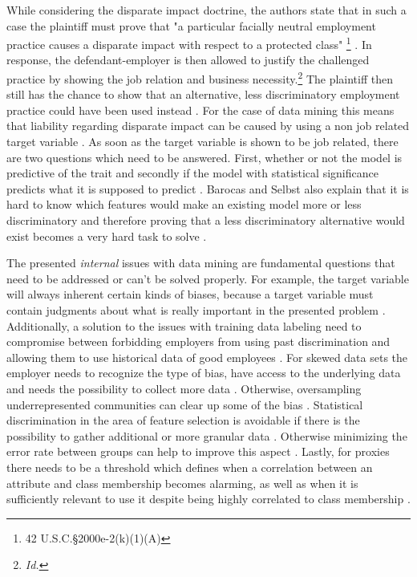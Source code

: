 While considering the disparate impact doctrine, the authors state that in such a case 
the plaintiff must prove that "a particular facially neutral employment practice causes 
a disparate impact with respect to a protected class" \footnote{ 42 U.S.C.§2000e-2(k)(1)(A) } \cite{Barocas.2016, titleVII}. In response, the defendant-employer 
is then allowed to justify the challenged practice by showing the job relation and 
business necessity.\footnote{ \textit{Id.} } The plaintiff then still has the chance 
to show that an alternative, less discriminatory employment practice could have been 
used instead \cite{Barocas.2016}. For the case of data mining this means that liability 
regarding disparate impact can be caused by using a non job related target variable 
\cite{Barocas.2016}. As soon as the target variable is shown to be job related, there 
are two questions which need to be answered. First, whether or not the model is 
predictive of the trait and secondly if the model with statistical significance 
predicts what it is supposed to predict \cite{Barocas.2016}. Barocas and Selbst 
also explain that it is hard to know which features would make an existing model more
or less discriminatory and therefore proving that a less discriminatory alternative 
would exist becomes a very hard task to solve \cite{Barocas.2016}.

The presented \textit{internal} issues with data mining are fundamental questions that need to be addressed or can't be solved properly. For example, the target variable will always inherent certain kinds of biases, because a target variable must contain judgments about what is really important in the presented problem \cite{Barocas.2016}. Additionally, a solution to the issues with training data labeling need to compromise between forbidding employers from using past discrimination and allowing them to use historical data of good employees \cite{Barocas.2016}. For skewed data sets the employer needs to recognize the type of bias, have access to the underlying data and needs the possibility to collect more data  \cite{Barocas.2016}. Otherwise, oversampling underrepresented communities can clear up some of the bias \cite{Barocas.2016}. Statistical discrimination in the area of feature selection is avoidable if there is the possibility to gather additional or more granular data \cite{Barocas.2016}. Otherwise minimizing the error rate between groups can help to improve this aspect \cite{Barocas.2016}. Lastly, for proxies there needs to be a threshold which defines when a correlation between an attribute and class membership becomes alarming, as well as when it is sufficiently relevant to use it despite being highly correlated to class membership \cite{Barocas.2016}.

